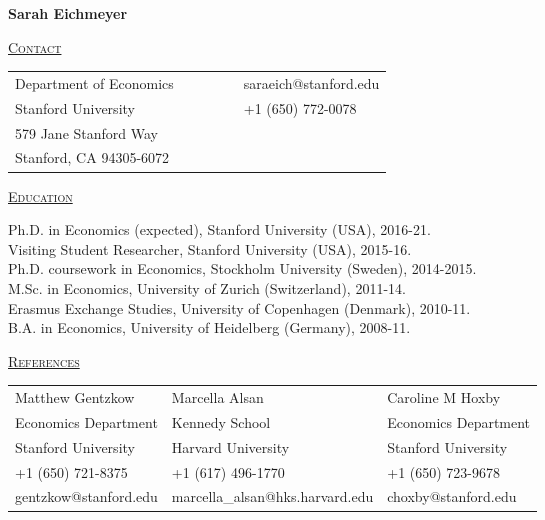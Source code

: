 \documentclass[letterpaper,11pt]{article}
\begin{document}
\begin{center}
\Large{\textbf{Sarah Eichmeyer}}
\end{center}



 \bigskip


 \underline {\textsc{Contact}}
 
\begin{tabular}{@{}l@{}cll@{}cl}
Department of Economics &&&&& saraeich@stanford.edu \\
Stanford University &&&&& +1 (650) 772-0078 \\
579 Jane Stanford Way && &&& \\
Stanford, CA 94305-6072 & & 
\end{tabular}

\bigskip
 
\underline {\textsc{Education}}

Ph.D. in Economics (expected), Stanford University (USA), 2016-21. \\
Visiting Student Researcher, Stanford University (USA), 2015-16. \\
Ph.D. coursework in Economics, Stockholm University (Sweden), 2014-2015. \\
M.Sc. in Economics, University of Zurich (Switzerland), 2011-14. \\
Erasmus Exchange Studies, University of Copenhagen (Denmark), 2010-11. \\
B.A. in Economics, University of Heidelberg (Germany), 2008-11.


\bigskip
 
\underline {\textsc{References}}



\begin{tabularx}{\textwidth}{@{}X@{}X@{}l}
Matthew Gentzkow & Marcella Alsan  & Caroline M Hoxby \\
Economics Department  & Kennedy School & Economics Department  \\
Stanford University & Harvard University & Stanford University \\ 
+1 (650) 721-8375 & +1 (617) 496-1770 & +1 (650) 723-9678  \\
gentzkow@stanford.edu & marcella\_alsan@hks.harvard.edu & choxby@stanford.edu \\
\end{tabularx}

\bigskip
 
\end{document}
